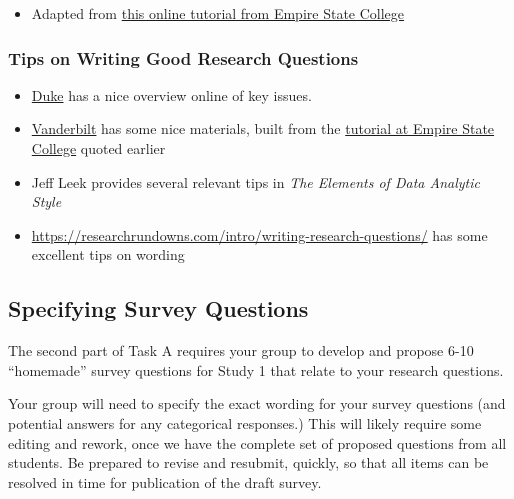 \documentclass[]{book}
\providecommand{\tightlist}{%
  \setlength{\itemsep}{0pt}\setlength{\parskip}{0pt}}
\theoremstyle{definition}
\theoremstyle{definition}
\theoremstyle{definition}
\theoremstyle{remark}
\begin{document}
\begin{itemize}
\tightlist
\item
  Adapted from
  \href{http://www8.esc.edu/htmlpages/writerold/menus.htm\#develop}{this
  online tutorial from Empire State College}
\end{itemize}

\hypertarget{tips-on-writing-good-research-questions}{%
\subsubsection{Tips on Writing Good Research
Questions}\label{tips-on-writing-good-research-questions}}

\begin{itemize}
\tightlist
\item
  \href{https://sites.duke.edu/urgws/files/2014/02/Research-Questions_WS-handout.pdf}{Duke}
  has a nice overview online of key issues.
\item
  \href{https://www.vanderbilt.edu/writing/wp-content/uploads/sites/164/2016/10/Formulating-Your-Research-Question.pdf}{Vanderbilt}
  has some nice materials, built from the
  \href{http://www8.esc.edu/htmlpages/writerold/menus.htm\#develop}{tutorial
  at Empire State College} quoted earlier
\item
  Jeff Leek provides several relevant tips in \emph{The Elements of Data
  Analytic Style}
\item
  \url{https://researchrundowns.com/intro/writing-research-questions/}
  has some excellent tips on wording
\end{itemize}

\hypertarget{specifying-survey-questions}{%
\subsection{Specifying Survey
Questions}\label{specifying-survey-questions}}

The second part of Task A requires your group to develop and propose
6-10 ``homemade'' survey questions for Study 1 that relate to your
research questions.

Your group will need to specify the exact wording for your survey
questions (and potential answers for any categorical responses.) This
will likely require some editing and rework, once we have the complete
set of proposed questions from all students. Be prepared to revise and
resubmit, quickly, so that all items can be resolved in time for
publication of the draft survey.
\end{document}
